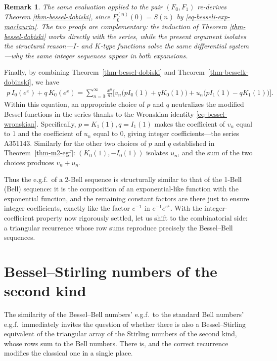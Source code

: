 \documentclass[a4paper]{amsart}
\numberwithin{equation}{section}
\newtheorem{remark}[theorem]{Remark}
\begin{document}
\begin{remark}
The same evaluation applied to the pair $(F_0, F_1)$ re-derives Theorem \ref{thm-bessel-dobiski}, since $F_0^{(n)}(0) = S(n)$ by \eqref{eq-besseli-exp-maclaurin}. The two proofs are complementary: the induction of Theorem \ref{thm-bessel-dobiski} works directly with the series, while the present argument isolates the structural reason---$I$- and $K$-type functions solve the same differential system---why the same integer sequences appear in both expansions.
\end{remark}

Finally, by combining Theorem~\ref{thm-bessel-dobiski} and Theorem~\ref{thm-besselk-dobinski}, we have
\begin{equation}
\begin{aligned}
p\, I_0(e^x) + q\, K_0(e^x) = \sum_{n=0}^\infty \frac{x^n}{n!} \bigg[ v_n \big(p I_0(1) + q K_0(1)\big) + u_n \big(p I_1(1) - q K_1(1)\big)\bigg].
\end{aligned}
\end{equation}
Within this equation, an appropriate choice of $p$ and $q$ neutralizes the modified Bessel functions in the series thanks to the Wronskian identity \eqref{eq-bessel-wronskian}. Specifically, $p = K_1(1), q = I_1(1)$ makes the coefficient of $v_n$ equal to 1 and the coefficient of $u_n$ equal to 0, giving integer coefficients---the series A351143. Similarly for the other two choices of $p$ and $q$ established in Theorem~\ref{thm-m2-egf}: $(K_0(1), -I_0(1))$ isolates $u_n$, and the sum of the two choices produces $v_n + u_n$.

Thus the e.g.f.\ of a 2-Bell sequence is structurally similar to that of the 1-Bell (Bell) sequence: it is the composition of an exponential-like function with the exponential function, and the remaining constant factors are there just to ensure integer coefficients, exactly like the factor $e^{-1}$ in $e^{-1}e^{e^x}$. With the integer-coefficient property now rigorously settled, let us shift to the combinatorial side: a triangular recurrence whose row sums reproduce precisely the Bessel--Bell sequences.

\section{Bessel--Stirling numbers of the second kind}\label{sec-2-stirling}

\noindent The similarity of the Bessel--Bell numbers' e.g.f.\ to the standard Bell numbers' e.g.f.\ immediately invites the question of whether there is also a Bessel--Stirling equivalent of the triangular array of the Stirling numbers of the second kind, whose rows sum to the Bell numbers. There is, and the correct recurrence modifies the classical one in a single place.
\end{document}
